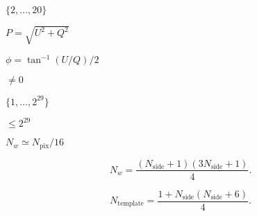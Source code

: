 \documentclass[12pt,twoside]{article}
\providecommand{\facname}{}%
\providecommand{\FACNAME}{}%
\providecommand{\projfullname}{}
\def\lthtmlcheckvsize{\ifdim\ht\sizebox<\vsize 
  \ifdim\wd\sizebox<\hsize\expandafter\hfill\fi \expandafter\vfill
  \else\expandafter\vss\fi}%
\begin{document}
{\newpage\clearpage
{}%
$\{2,\ldots,20\}$%
\lthtmlindisplaymathZ
\lthtmlcheckvsize\clearpage}

{\newpage\clearpage
{}%
$P = \sqrt{U^2 + Q^2}$%
\lthtmlindisplaymathZ
\lthtmlcheckvsize\clearpage}

{\newpage\clearpage
{}%
$\phi = \tan^{-1}(U/Q) /2$%
\lthtmlindisplaymathZ
\lthtmlcheckvsize\clearpage}

{\newpage\clearpage
{}%
$\ne 0$%
\lthtmlindisplaymathZ
\lthtmlcheckvsize\clearpage}


\renewcommand{\projfullname}{{a Mollweide}}

\renewcommand{\facname}{{neighbours\_nest }}

\renewcommand{\facname}{{neighbours\_ring }}

\renewcommand{\facname}{{npix2nside }}

\renewcommand{\FACNAME}{{NPIX2NSIDE }}
{\newpage\clearpage
{}%
$\{1,\ldots,2^{29}\}$%
\lthtmlindisplaymathZ
\lthtmlcheckvsize\clearpage}


\renewcommand{\facname}{{nside2npix}}

\renewcommand{\FACNAME}{{NSIDE2NPIX }}
{\newpage\clearpage
{}%
$ \le 2^{29}$%
\lthtmlindisplaymathZ
\lthtmlcheckvsize\clearpage}


\renewcommand{\facname}{{nside2npweights }}

\renewcommand{\FACNAME}{{NSIDE2NPWEIGHTS }}
{\newpage\clearpage
{}%
$N_w  \simeq N_{\mathrm{pix}}/16$%
\lthtmlindisplaymathZ
\lthtmlcheckvsize\clearpage}

{\newpage\clearpage
{}%
\begin{displaymath}N_w=\frac{(N_{\mathrm{side}}+1)(3N_{\mathrm{side}}+1)}{4}.\end{displaymath}%
\lthtmldisplayZ
\lthtmlcheckvsize\clearpage}


\renewcommand{\facname}{{nside2ntemplates }}

\renewcommand{\FACNAME}{{NSIDE2NTEMPLATES }}
{\newpage\clearpage
{}%
\begin{displaymath}N_{\mathrm{template}}=\frac{1+N_{\mathrm{side}}(N_{\mathrm{side}}+6)}{4}.\end{displaymath}%
\lthtmldisplayZ
\lthtmlcheckvsize\clearpage}
\end{document}
